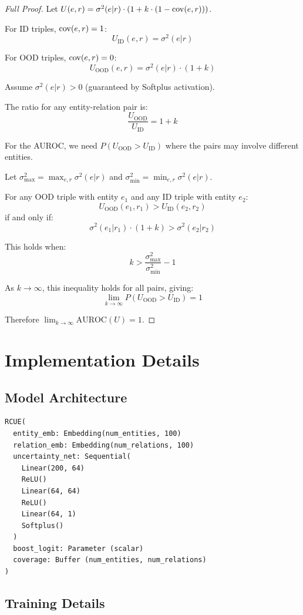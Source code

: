 \begin{proof}[Full Proof]
Let $U(e, r) = \sigma^2(e | r) \cdot (1 + k \cdot (1 - \mathrm{cov}(e, r)))$.

For ID triples, $\mathrm{cov}(e, r) = 1$:
\[
U_\text{ID}(e, r) = \sigma^2(e | r)
\]

For OOD triples, $\mathrm{cov}(e, r) = 0$:
\[
U_\text{OOD}(e, r) = \sigma^2(e | r) \cdot (1 + k)
\]

Assume $\sigma^2(e | r) > 0$ (guaranteed by Softplus activation).

The ratio for any entity-relation pair is:
\[
\frac{U_\text{OOD}}{U_\text{ID}} = 1 + k
\]

For the AUROC, we need $P(U_\text{OOD} > U_\text{ID})$ where the pairs may involve different entities.

Let $\sigma^2_\text{max} = \max_{e,r} \sigma^2(e | r)$ and $\sigma^2_\text{min} = \min_{e,r} \sigma^2(e | r)$.

For any OOD triple with entity $e_1$ and any ID triple with entity $e_2$:
\[
U_\text{OOD}(e_1, r_1) > U_\text{ID}(e_2, r_2)
\]
if and only if:
\[
\sigma^2(e_1 | r_1) \cdot (1 + k) > \sigma^2(e_2 | r_2)
\]

This holds when:
\[
k > \frac{\sigma^2_\text{max}}{\sigma^2_\text{min}} - 1
\]

As $k \to \infty$, this inequality holds for all pairs, giving:
\[
\lim_{k \to \infty} P(U_\text{OOD} > U_\text{ID}) = 1
\]

Therefore $\lim_{k \to \infty} \text{AUROC}(U) = 1$.
\end{proof}

\section{Implementation Details}
\label{app:impl}

\subsection{Model Architecture}

\begin{verbatim}
RCUE(
  entity_emb: Embedding(num_entities, 100)
  relation_emb: Embedding(num_relations, 100)
  uncertainty_net: Sequential(
    Linear(200, 64)
    ReLU()
    Linear(64, 64)
    ReLU()
    Linear(64, 1)
    Softplus()
  )
  boost_logit: Parameter (scalar)
  coverage: Buffer (num_entities, num_relations)
)
\end{verbatim}

\subsection{Training Details}

